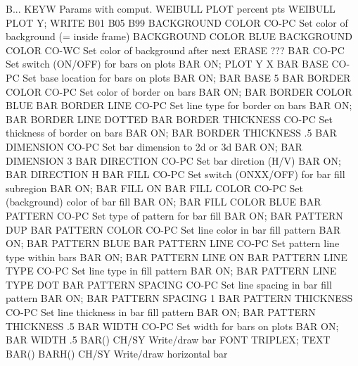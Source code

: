B...                        KEYW  Params with comput. WEIBULL PLOT percent pts
                                  WEIBULL PLOT Y; WRITE B01 B05 B99
BACKGROUND COLOR            CO-PC Set color of background (= inside frame)
                                  BACKGROUND COLOR BLUE
BACKGROUND COLOR            CO-WC Set color of background after next ERASE
                                  ???
BAR                         CO-PC Set switch (ON/OFF) for bars on plots
                                  BAR ON; PLOT Y X
BAR BASE                    CO-PC Set base location for bars on plots
                                  BAR ON; BAR BASE 5
BAR BORDER COLOR            CO-PC Set color of border on bars
                                  BAR ON; BAR BORDER COLOR BLUE
BAR BORDER LINE             CO-PC Set line type for border on bars
                                  BAR ON; BAR BORDER LINE DOTTED
BAR BORDER THICKNESS        CO-PC Set thickness of border on bars
                                  BAR ON; BAR BORDER THICKNESS .5
BAR DIMENSION               CO-PC Set bar dimension to 2d or 3d
                                  BAR ON; BAR DIMENSION 3
BAR DIRECTION               CO-PC Set bar dirction (H/V)
                                  BAR ON; BAR DIRECTION H
BAR FILL                    CO-PC Set switch (ONXX/OFF) for bar fill subregion
                                  BAR ON; BAR FILL ON
BAR FILL COLOR              CO-PC Set (background) color of bar fill
                                  BAR ON; BAR FILL COLOR BLUE
BAR PATTERN                 CO-PC Set type of pattern for bar fill
                                  BAR ON; BAR PATTERN DUP
BAR PATTERN COLOR           CO-PC Set line color in bar fill pattern
                                  BAR ON; BAR PATTERN BLUE
BAR PATTERN LINE            CO-PC Set pattern line type within bars
                                  BAR ON; BAR PATTERN LINE ON
BAR PATTERN LINE TYPE       CO-PC Set line type in fill pattern
                                  BAR ON; BAR PATTERN LINE TYPE DOT
BAR PATTERN SPACING         CO-PC Set line spacing in bar fill pattern
                                  BAR ON; BAR PATTERN SPACING 1
BAR PATTERN THICKNESS       CO-PC Set line thickness in bar fill pattern
                                  BAR ON; BAR PATTERN THICKNESS .5
BAR WIDTH                   CO-PC Set width for bars on plots
                                  BAR ON; BAR WIDTH .5
BAR()                       CH/SY Write/draw bar
                                  FONT TRIPLEX; TEXT BAR()
BARH()                      CH/SY Write/draw horizontal bar
